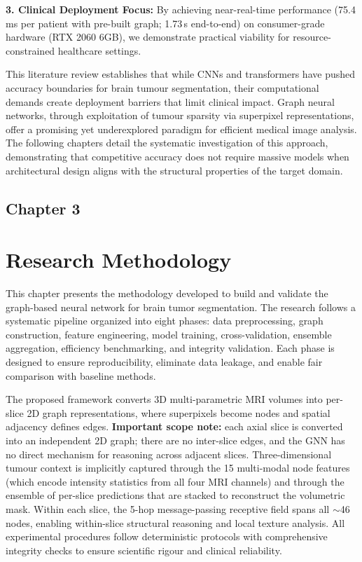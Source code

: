 \documentclass{article}
\begin{document}
\textbf{3. Clinical Deployment Focus:} By achieving near-real-time performance (75.4\,ms per patient with pre-built graph; 1.73\,s end-to-end) on consumer-grade hardware (RTX 2060 6GB), we demonstrate practical viability for resource-constrained healthcare settings.

\vspace{5mm}

This literature review establishes that while CNNs and transformers have pushed accuracy boundaries for brain tumour segmentation, their computational demands create deployment barriers that limit clinical impact. Graph neural networks, through exploitation of tumour sparsity via superpixel representations, offer a promising yet underexplored paradigm for efficient medical image analysis. The following chapters detail the systematic investigation of this approach, demonstrating that competitive accuracy does not require massive models when architectural design aligns with the structural properties of the target domain.

\clearpage
\cleardoublepage
\begin{center}
    \section*{\fontsize{20}{20}\selectfont Chapter 3}
\end{center}
\vspace{10mm}
\section{Research Methodology}

This chapter presents the methodology developed to build and validate the graph-based neural network for brain tumor segmentation. The research follows a systematic pipeline organized into eight phases: data preprocessing, graph construction, feature engineering, model training, cross-validation, ensemble aggregation, efficiency benchmarking, and integrity validation. Each phase is designed to ensure reproducibility, eliminate data leakage, and enable fair comparison with baseline methods.

The proposed framework converts 3D multi-parametric MRI volumes into per-slice 2D graph representations, where superpixels become nodes and spatial adjacency defines edges. \textbf{Important scope note:} each axial slice is converted into an independent 2D graph; there are no inter-slice edges, and the GNN has no direct mechanism for reasoning across adjacent slices. Three-dimensional tumour context is implicitly captured through the 15 multi-modal node features (which encode intensity statistics from all four MRI channels) and through the ensemble of per-slice predictions that are stacked to reconstruct the volumetric mask. Within each slice, the 5-hop message-passing receptive field spans all $\sim$46 nodes, enabling within-slice structural reasoning and local texture analysis. All experimental procedures follow deterministic protocols with comprehensive integrity checks to ensure scientific rigour and clinical reliability.
\end{document}
